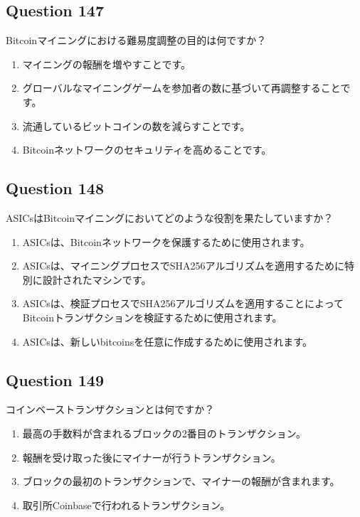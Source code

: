 \documentclass[12pt,a4paper]{article}
\begin{document}
\bigskip


\subsection*{Question 147}
Bitcoinマイニングにおける難易度調整の目的は何ですか？

\begin{enumerate}[label=\Alph*., leftmargin=*]
\item マイニングの報酬を増やすことです。
\item グローバルなマイニングゲームを参加者の数に基づいて再調整することです。
\item 流通しているビットコインの数を減らすことです。
\item Bitcoinネットワークのセキュリティを高めることです。
\end{enumerate}

\bigskip


\subsection*{Question 148}
ASICsはBitcoinマイニングにおいてどのような役割を果たしていますか？

\begin{enumerate}[label=\Alph*., leftmargin=*]
\item ASICsは、Bitcoinネットワークを保護するために使用されます。
\item ASICsは、マイニングプロセスでSHA256アルゴリズムを適用するために特別に設計されたマシンです。
\item ASICsは、検証プロセスでSHA256アルゴリズムを適用することによってBitcoinトランザクションを検証するために使用されます。
\item ASICsは、新しいbitcoinsを任意に作成するために使用されます。
\end{enumerate}

\bigskip


\subsection*{Question 149}
コインベーストランザクションとは何ですか？

\begin{enumerate}[label=\Alph*., leftmargin=*]
\item 最高の手数料が含まれるブロックの2番目のトランザクション。
\item 報酬を受け取った後にマイナーが行うトランザクション。
\item ブロックの最初のトランザクションで、マイナーの報酬が含まれます。
\item 取引所Coinbaseで行われるトランザクション。
\end{enumerate}
\end{document}
